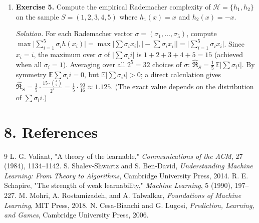 \begin{enumerate}[leftmargin=*,itemsep=0.9em]
\item \textbf{Exercise 5.} Compute the empirical Rademacher complexity of $\mathcal H=\{h_1,h_2\}$ on the sample $S=(1,2,3,4,5)$ where $h_1(x)=x$ and $h_2(x)=-x$.

\emph{Solution.} For each Rademacher vector $\sigma=(\sigma_1,\ldots,\sigma_5)$, compute $\max\bigl|\sum_{i=1}^5\sigma_i h(x_i)\bigr|=\max\bigl|\sum\sigma_i x_i\bigr|,\bigl|-\sum\sigma_i x_i\bigr|\bigr|=\bigl|\sum_{i=1}^5\sigma_i x_i\bigr|$. Since $x_i=i$, the maximum over $\sigma$ of $\bigl|\sum\sigma_i i\bigr|$ is $1+2+3+4+5=15$ (achieved when all $\sigma_i=1$). Averaging over all $2^5=32$ choices of $\sigma$: $\hat{\mathfrak R}_S=\frac{1}{5}\,\mathbb{E}\bigl|\sum\sigma_i i\bigr|$. By symmetry $\mathbb{E}\sum\sigma_i i=0$, but $\mathbb{E}\bigl|\sum\sigma_i i\bigr|>0$; a direct calculation gives $\hat{\mathfrak R}_S=\frac{1}{5}\cdot\frac{15\cdot\binom{4}{2}}{2^4}=\frac{1}{5}\cdot\frac{90}{16}\approx1.125$. (The exact value depends on the distribution of $\sum\sigma_i i$.)

\end{enumerate}
\section*{8. References}

\begin{thebibliography}{9}
 L. G. Valiant, "A theory of the learnable," \emph{Communications of the ACM}, 27 (1984), 1134--1142.
 S. Shalev-Shwartz and S. Ben-David, \emph{Understanding Machine Learning: From Theory to Algorithms}, Cambridge University Press, 2014.
 R. E. Schapire, "The strength of weak learnability," \emph{Machine Learning}, 5 (1990), 197--227.
 M. Mohri, A. Rostamizadeh, and A. Talwalkar, \emph{Foundations of Machine Learning}, MIT Press, 2018.
 N. Cesa-Bianchi and G. Lugosi, \emph{Prediction, Learning, and Games}, Cambridge University Press, 2006.
\end{thebibliography}
